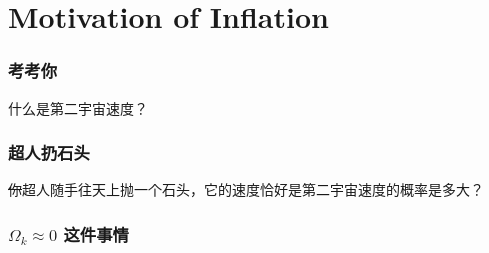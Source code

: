\documentclass[CJK,13pt]{beamer}
\date{}
\begin{document}
  \bch

  \section{Motivation of Inflation}

  \begin{frame}
    \frametitle{考考你}
    什么是第二宇宙速度？
  \end{frame}


  \begin{frame}
    \frametitle{超人扔石头}
    \sout{你}超人随手往天上抛一个石头，它的速度恰好是第二宇宙速度的概率是多大？
  \end{frame}
  
  \begin{frame}
    \frametitle{$\Omega_k\approx 0$ 这件事情}
  \end{frame}
  
    \ech
\end{document}
